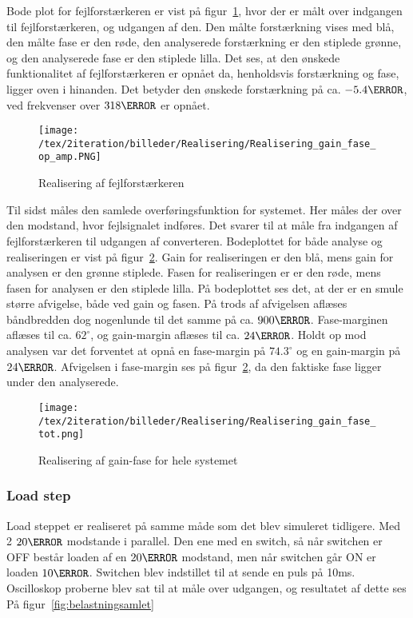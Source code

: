 Bode plot for fejlforstærkeren er vist på figur~\ref{fig:Realisering_error_op_amp_2}, hvor der er målt over indgangen til fejlforstærkeren, og udgangen af den. Den målte forstærkning vises med blå, den målte fase er den røde, den analyserede forstærkning er den stiplede grønne, og den analyserede fase er den stiplede lilla. Det ses, at den ønskede funktionalitet af fejlforstærkeren er opnået da, henholdsvis forstærkning og fase, ligger oven i hinanden. Det betyder den ønskede forstærkning på ca. $-5.4\decibel$, ved frekvenser over $318\hertz$ er opnået. 

\begin{figure}[H]
	\center
	\texttt{[image: /tex/2iteration/billeder/Realisering/Realisering\_gain\_fase\_op\_amp.PNG]}
	\caption{Realisering af fejlforstærkeren}
	\label{fig:Realisering_error_op_amp_2}
\end{figure}



Til sidst måles den samlede overføringsfunktion for systemet. Her måles der over den modstand, hvor fejlsignalet indføres. Det svarer til at måle fra indgangen af fejlforstærkeren til udgangen af converteren. Bodeplottet for både analyse og realiseringen er vist på figur~\ref{fig:realisering_gain_fase_tot}. Gain for realiseringen er den blå, mens gain for analysen er den grønne stiplede. Fasen for realiseringen er er den røde, mens fasen for analysen er den stiplede lilla. På bodeplottet ses det, at der er en smule større afvigelse, både ved gain og fasen. På trods af afvigelsen aflæses båndbredden dog nogenlunde til det samme på ca. $900\hertz$. Fase-marginen aflæses til ca. $62^\circ$, og gain-margin aflæses til ca. $24\decibel$. Holdt op mod analysen var det forventet at opnå en fase-margin på $74.3^\circ$ og en gain-margin på $24\decibel$. Afvigelsen i fase-margin ses på figur~\ref{fig:realisering_gain_fase_tot}, da den faktiske fase ligger under den analyserede. 

\begin{figure}[H]
	\center
	\texttt{[image: /tex/2iteration/billeder/Realisering/Realisering\_gain\_fase\_tot.png]}
	\caption{Realisering af gain-fase for hele systemet}
	\label{fig:realisering_gain_fase_tot}
\end{figure}



\subsubsection{Load step} \label{loadsteprea}
\noindent Load steppet er realiseret på samme måde som det blev simuleret tidligere. Med 2 $20\ohm$ modstande i parallel. Den ene med en switch, så når switchen er OFF består loaden af en $20\ohm$ modstand, men når switchen går ON er loaden $10\ohm$. Switchen blev indstillet til at sende en puls på 10ms. Oscilloskop proberne blev sat til at måle over udgangen, og resultatet af dette ses På figur~\ref{fig:belastningsamlet} 

